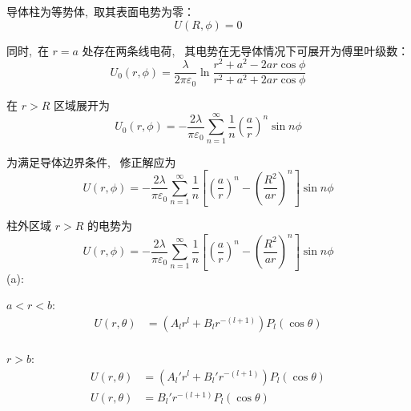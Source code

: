 导体柱为等势体, \,取其表面电势为零：
\[
U(R,\phi)=0
\]

同时, \,在 $r=a$ 处存在两条线电荷, \,
其电势在无导体情况下可展开为傅里叶级数：
\[
U_0(r,\phi)
=
\frac{\lambda}{2\pi\varepsilon_0}
\ln\frac{r^2+a^2-2ar\cos\phi}
{r^2+a^2+2ar\cos\phi}
\]

在 $r>R$ 区域展开为
\[
U_0(r,\phi)
=
-\frac{2\lambda}{\pi\varepsilon_0}
\sum_{n=1}^{\infty}
\frac{1}{n}
\left(\frac{a}{r}\right)^n
\sin n\phi
\]

为满足导体边界条件, \,
修正解应为
\[
U(r,\phi)
=
-\frac{2\lambda}{\pi\varepsilon_0}
\sum_{n=1}^{\infty}
\frac{1}{n}
\left[
\left(\frac{a}{r}\right)^n
-
\left(\frac{R^2}{ar}\right)^n
\right]
\sin n\phi
\]


柱外区域 $r>R$ 的电势为
\[{
U(r,\phi)
=
-\frac{2\lambda}{\pi\varepsilon_0}
\sum_{n=1}^{\infty}
\frac{1}{n}
\left[
\left(\frac{a}{r}\right)^n
-
\left(\frac{R^2}{ar}\right)^n
\right]
\sin n\phi
}
\]
(a):

$a<r<b$:
\begin{align*}
    U(r,\theta)
&=
\left(
A_l r^l
+
B_l r^{-(l+1)}
\right)
P_{l}(\cos\theta)\\
\end{align*}

$r>b$:
\begin{align*}
    U(r,\theta)
&=
\left(
A_l' r^l
+
B_l' r^{-(l+1)}
\right)
P_{l}(\cos\theta)\\
    U(r,\theta)
&=
B_l' r^{-(l+1)}
P_{l}(\cos\theta)\\
\end{align*}

